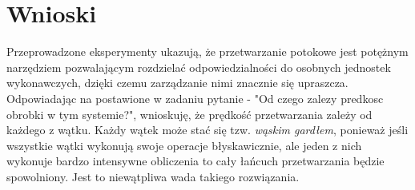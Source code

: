 \documentclass[12pt]{article}
\begin{document}
\section{Wnioski}
Przeprowadzone eksperymenty ukazują, że przetwarzanie potokowe jest potężnym narzędziem pozwalającym rozdzielać odpowiedzialności do osobnych jednostek wykonawczych, dzięki czemu zarządzanie nimi znacznie się upraszcza.
Odpowiadając na postawione w zadaniu pytanie - "Od czego zalezy predkosc obrobki w tym systemie?", wnioskuję, że prędkość przetwarzania zależy od każdego z wątku. Każdy wątek może stać się tzw. \emph{wąskim gardłem}, ponieważ jeśli wszystkie wątki wykonują swoje operacje błyskawicznie, ale jeden z nich wykonuje bardzo intensywne obliczenia to cały łańcuch przetwarzania będzie spowolniony. Jest to niewątpliwa wada takiego rozwiązania.
\end{document}
